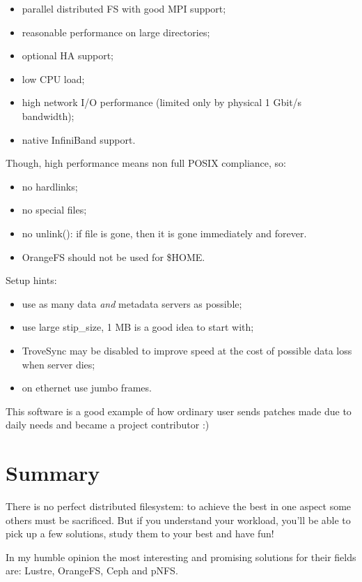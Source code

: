 \documentclass[10pt, a5paper]{article}
\begin{document}
{\begin{itemize}
  \item parallel distributed FS with good MPI support;
  \item reasonable performance on large directories;
  \item optional HA support;
  \item low CPU load;
  \item high network I/O performance (limited only by physical 1 Gbit/s bandwidth);
  \item native InfiniBand\cite{bib15} support.
\end{itemize}

Though, high performance means non full POSIX compliance, so:

\begin{itemize}
  \item no hardlinks;
  \item no special files;
  \item no unlink(): if file is gone, then it is gone immediately and forever.
  \item OrangeFS should not be used for \$HOME.
\end{itemize}

Setup hints:

\begin{itemize}
  \item use as many data \emph{and} metadata servers as possible;
  \item use large stip\_size, 1 MB is a good idea to start with;
  \item TroveSync may be disabled to improve speed at the cost of possible data loss when server dies;
  \item on ethernet use jumbo frames.
\end{itemize}

This software is a good example of how ordinary user sends patches made due to daily needs and became a project contributor :)

\section*{Summary}

There is no perfect distributed filesystem: to achieve the best in one aspect some others must be sacrificed. But if you understand your workload, you'll be able to pick up a few solutions, study them to your best and have fun!

In my humble opinion the most interesting and promising solutions for their fields are: Lustre\cite{bib10}, OrangeFS\cite{bib11}, Ceph\cite{bib12} and pNFS\cite{bib4}.

}
\end{document}
